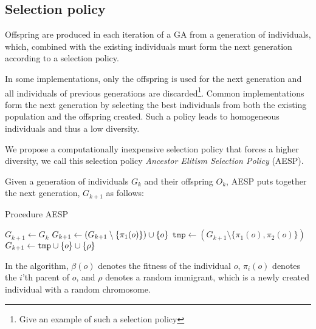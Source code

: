 \subsection{Selection policy}
Offspring are produced in each iteration of a GA from a generation of individuals, which, combined with the existing individuals must form the next generation according to a selection policy.

In some implementations, only the offspring is used for the next generation and all individuals of previous generations are discarded\footnote{ Give an example of such a selection policy}. Common implementations form the next generation by selecting the best individuals from both the existing population and the offspring created\cite{masterThesisGANN}. Such a policy leads to homogeneous individuals and thus a low diversity.

We propose a computationally inexpensive selection policy that forces a higher diversity, we call this selection policy \emph{Ancestor Elitism Selection Policy} (AESP).

Given a generation of individuals $G_k$ and their offspring $O_k$, AESP puts together the next generation, $G_{k+1}$ as follows:
%
\begin{algorithm}
  \caption{Procedure AESP}\label{alg:aesp}
\begin{algorithmic}[1]
  \State $G_{k+1} \gets G_k$
        \State $G_{k+1} \gets (G_{k+1} \setminus \{ \pi_1(o) \}) \cup \{ o \}$
      \EndIf
    \Else
      \State $\mathtt{tmp} \gets (G_{k+1} \setminus \{\pi_1(o), \pi_2(o)\})$ 
        \State $G_{k+1} \gets \mathtt{tmp} \cup \{ o \} \cup \{ \rho \}$
      \EndIf
    \EndIf
  \EndFor
\EndProcedure
\end{algorithmic}
\end{algorithm}
%
In the algorithm, $\beta(o)$ denotes the fitness of the individual $o$, $\pi_i(o)$ denotes the $i$'th parent of $o$, and $\rho$ denotes a random immigrant, which is a newly created individual with a random chromosome.
